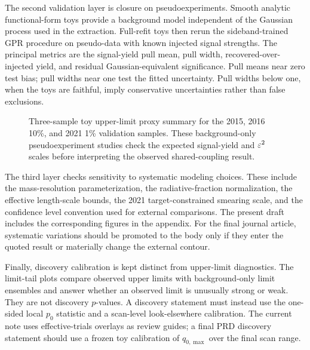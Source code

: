 The second validation layer is closure on pseudoexperiments. Smooth analytic
functional-form toys provide a background model independent of the Gaussian process
used in the extraction. Full-refit toys then rerun the sideband-trained GPR procedure
on pseudo-data with known injected signal strengths. The principal metrics are the
signal-yield pull mean, pull width, recovered-over-injected yield, and residual
Gaussian-equivalent significance. Pull means near zero test bias; pull widths near one
test the fitted uncertainty. Pull widths below one, when the toys are faithful, imply
conservative uncertainties rather than false exclusions.

\begin{figure}[t]
\centering
{}
\caption{Three-sample toy upper-limit proxy summary for the 2015, 2016 10\%, and 2021
1\% validation samples. These background-only pseudoexperiment studies check the
expected signal-yield and $\varepsilon^2$ scales before interpreting the observed
shared-coupling result.}
\label{fig:toy-upper-proxy}
\end{figure}

The third layer checks sensitivity to systematic modeling choices. These include the
mass-resolution parameterization, the radiative-fraction normalization, the effective
length-scale bounds, the 2021 target-constrained smearing scale, and the confidence
level convention used for external comparisons. The present draft includes the
corresponding figures in the appendix. For the final journal article, systematic
variations should be promoted to the body only if they enter the quoted result or
materially change the external contour.

Finally, discovery calibration is kept distinct from upper-limit diagnostics. The
limit-tail plots compare observed upper limits with background-only limit ensembles and
answer whether an observed limit is unusually strong or weak. They are not discovery
$p$-values. A discovery statement must instead use the one-sided local $p_0$ statistic
and a scan-level look-elsewhere calibration. The current note uses effective-trials
overlays as review guides; a final PRD discovery statement should use a frozen toy
calibration of $q_{0,\max}$ over the final scan range.
